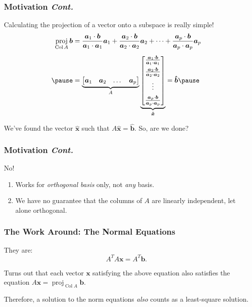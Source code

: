 \documentclass{beamer}
\renewcommand{\vec}[1]{\bm{#1}}
\DeclareMathOperator{\proj}{proj}
\DeclareMathOperator{\colspace}{Col}
\begin{document}
	\begin{frame}
		\frametitle{Motivation \textit{Cont.}}
		Calculating the projection of a vector onto a subspace is really simple! \pause 
		\begin{align*}
			\proj_{\colspace A} \vec{b} &= \frac{\vec{a}_1 \cdot \vec{b}}{\vec{a}_1 \cdot \vec{a}_1}\vec{a}_1 + \frac{\vec{a}_2 \cdot \vec{b}}{\vec{a}_2 \cdot \vec{a}_2}\vec{a}_2 + \cdots + \frac{\vec{a}_p \cdot \vec{b}}{\vec{a}_p \cdot \vec{a}_p}\vec{a}_p \\[0.5em] \pause
								 &= \underbrace{\begin{bmatrix}\vec{a}_1 & \vec{a}_2 & \dots & \vec{a}_p\end{bmatrix}}_{A}\underbrace{\begin{bmatrix}\frac{\vec{a}_1 \cdot \vec{b}}{\vec{a}_1 \cdot \vec{a}_1} \\[0.5em] \frac{\vec{a}_2 \cdot \vec{b}}{\vec{a}_2 \cdot \vec{a}_2} \\[0.5em] \vdots \\[0.5em] \frac{\vec{a}_p \cdot \vec{b}}{\vec{a}_p \cdot \vec{a}_p}\end{bmatrix}}_{\vec{\hat{x}}} = \vec{\hat{b}} \pause
		\end{align*}

		We've found the vector \(\vec{\hat{x}}\) such that \(A\vec{\hat{x}} = \vec{\hat{b}}\). So, are we done? 
	\end{frame}

	\begin{frame}
		\frametitle{Motivation \textit{Cont.}}
		No! 
		\begin{enumerate}
			\item<2-> Works for \emph{orthogonal basis} only, not \emph{any} basis.
			\item<3-> We have no guarantee that the columns of \(A\) are linearly independent, let alone orthogonal.
		\end{enumerate}
	\end{frame}

	\begin{frame}
		\frametitle{The Work Around: The Normal Equations}
		They are:
			\[A^TA\vec{x} = A^T\vec{b}.\]\pause

		Turns out that each vector \(\vec{x}\) satisfying the above equation also satisfies the equation 
		\(A\vec{x} = \proj_{\colspace A} \vec{b}\).

		Therefore, a solution to the norm equations \emph{also} counts as a least-square solution.
	\end{frame}
	
\end{document}
